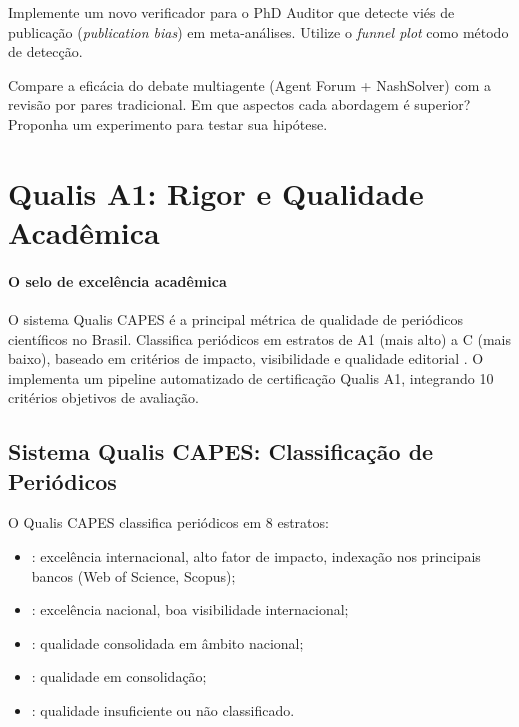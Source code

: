 \begin{exercicio}
Implemente um novo verificador para o PhD Auditor que detecte
viés de publicação (\textit{publication bias}) em meta-análises.
Utilize o \textit{funnel plot} como método de detecção.
\end{exercicio}

\begin{exercicio}
Compare a eficácia do debate multiagente (Agent Forum + NashSolver)
com a revisão por pares tradicional. Em que aspectos cada abordagem
é superior? Proponha um experimento para testar sua hipótese.
\end{exercicio}

\section{Qualis A1: Rigor e Qualidade Acadêmica}
\label{sec:qualis-a1}
\nivelphd

\paragraph{O selo de excelência acadêmica} O sistema Qualis CAPES é a principal métrica de qualidade de
periódicos científicos no Brasil. Classifica periódicos em estratos
de A1 (mais alto) a C (mais baixo), baseado em critérios de
impacto, visibilidade e qualidade editorial \cite{capes2022qualis}.
O \opencodeeco{} implementa um pipeline automatizado de certificação
Qualis A1, integrando 10 critérios objetivos de avaliação.

\subsection{Sistema Qualis CAPES: Classificação de Periódicos}

O Qualis CAPES classifica periódicos em 8 estratos:
\begin{itemize}
\item {}: excelência internacional, alto fator de impacto,
indexação nos principais bancos (Web of Science, Scopus);
\item {}: excelência nacional, boa visibilidade
internacional;
\item {}: qualidade consolidada em âmbito nacional;
\item {}: qualidade em consolidação;
\item {}: qualidade insuficiente ou não classificado.
\end{itemize}

